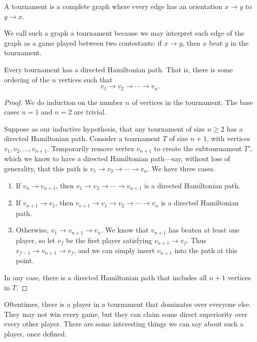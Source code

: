 \documentclass[../m055main.tex]{subfiles}
\begin{document}
\begin{definition}[Tournament]
    A tournament is a complete graph where every edge has an orientation $x \to y$ to $y \to x$.
\end{definition}

We call such a graph a tournament because we may interpret each edge of the graph as a game played between two contestants: if $x \to y$, then $x$ beat $y$ in the tournament.

\begin{theorem}[]
    Every tournament has a directed Hamiltonian path.
    That is, there is some ordering of the $n$ vertices such that
    \[ v_1 \to v_2 \to \cdots \to v_n. \]
\end{theorem}

\begin{proof}
    We do induction on the number $n$ of vertices in the tournament.
    The base cases $n=1$ and $n=2$ are trivial.

    Suppose as our inductive hypothesis, that any tournament of size $n \geq 2$ has a directed Hamiltonian path.
    Consider a tournament $T$ of size $n+1$, with vertices $v_1, v_2, \ldots, v_{n+1}$.
    Temporarily remove vertex $v_{n+1}$ to create the subtournament $T'$, which we know to have a directed Hamiltonian path---say, without loss of generality, that this path is $v_1 \to v_2 \to \cdots \to v_n$.
    We have three cases.
    \begin{enumerate}[label=(\alph*)]
        \item If $v_n \to v_{n+1}$, then $v_1 \to v_2 \to \cdots \to v_{n+1}$ is a directed Hamiltonian path.
        \item If $v_{n+1} \to v_1$, then $v_{v+1} \to v_1 \to v_2 \to \cdots \to v_n$ is a directed Hamiltonian path.
        \item Otherwise, $v_1 \to v_{n+1} \to v_n$.
        We know that $v_{n+1}$ has beaten at least one player, so let $v_f$ be the first player satisfying $v_{n+1} \to v_f$.
        Thus $v_{f-1} \to v_{n+1} \to v_f$, and we can simply insert $v_{n+1}$ into the path at this point.
    \end{enumerate}
    In any case, there is a directed Hamiltonian path that includes all $n+1$ vertices in $T$.
\end{proof}

Oftentimes, there is a player in a tournament that dominates over everyone else.
They may not win every game, but they can claim some direct superiority over every other player.
There are some interesting things we can say about such a player, once defined.
\end{document}
